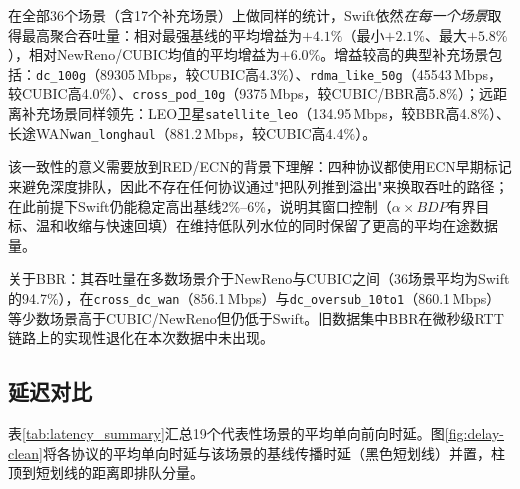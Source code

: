 在全部36个场景（含17个补充场景）上做同样的统计，Swift依然\emph{在每一个场景}取得最高聚合吞吐量：相对最强基线的平均增益为$+4.1\%$（最小$+2.1\%$、最大$+5.8\%$），相对NewReno/CUBIC均值的平均增益为$+6.0\%$。增益较高的典型补充场景包括：\texttt{dc\_100g}（89305\,Mbps，较CUBIC高4.3\%）、\texttt{rdma\_like\_50g}（45543\,Mbps，较CUBIC高4.0\%）、\texttt{cross\_pod\_10g}（9375\,Mbps，较CUBIC/BBR高5.8\%）；远距离补充场景同样领先：LEO卫星\texttt{satellite\_leo}（134.95\,Mbps，较BBR高4.8\%）、长途WAN\texttt{wan\_longhaul}（881.2\,Mbps，较CUBIC高4.4\%）。

该一致性的意义需要放到RED/ECN的背景下理解：四种协议都使用ECN早期标记来避免深度排队，因此不存在任何协议通过"把队列推到溢出"来换取吞吐的路径；在此前提下Swift仍能稳定高出基线2\%--6\%，说明其窗口控制（$\alpha \times BDP$有界目标、温和收缩与快速回填）在维持低队列水位的同时保留了更高的平均在途数据量。

关于BBR：其吞吐量在多数场景介于NewReno与CUBIC之间（36场景平均为Swift的94.7\%），在\texttt{cross\_dc\_wan}（856.1\,Mbps）与\texttt{dc\_oversub\_10to1}（860.1\,Mbps）等少数场景高于CUBIC/NewReno但仍低于Swift。旧数据集中BBR在微秒级RTT链路上的实现性退化在本次数据中未出现。

\subsection{延迟对比}

表\ref{tab:latency_summary}汇总19个代表性场景的平均单向前向时延。图\ref{fig:delay-clean}将各协议的平均单向时延与该场景的基线传播时延（黑色短划线）并置，柱顶到短划线的距离即排队分量。

